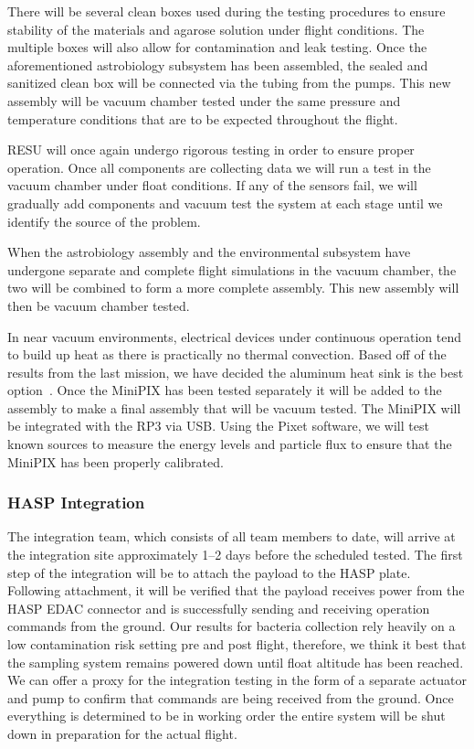 There will be several clean boxes used during the testing procedures to ensure stability of the materials and agarose solution under flight conditions. The multiple boxes will also allow for contamination and leak testing. Once the aforementioned astrobiology subsystem has been assembled, the sealed and sanitized clean box will be connected via the tubing from the pumps. This new assembly will be vacuum chamber tested under the same pressure and temperature conditions that are to be expected throughout the flight. 

RESU will once again undergo rigorous testing in order to ensure proper operation. Once all components are collecting data we will run a test in the vacuum chamber under float conditions. If any of the sensors fail, we will gradually add components and vacuum test the system at each stage until we identify the source of the problem.

When the astrobiology assembly and the environmental subsystem have undergone separate and complete flight simulations in the vacuum chamber, the two will be combined to form a more complete assembly. This new assembly will then be vacuum chamber tested. 

In near vacuum environments, electrical devices under continuous operation tend to build up heat as there is practically no thermal convection. Based off of the results from the last mission, we have decided the aluminum heat sink is the best option~\cite{SORA}. Once the MiniPIX has been tested separately it will be added to the assembly to make a final assembly that will be vacuum tested. The MiniPIX will be integrated with the RP3 via USB. Using the Pixet software, we will test known sources to measure the energy levels and particle flux to ensure that the MiniPIX has been properly calibrated.
    

\subsubsection{HASP Integration}
The integration team, which consists of all team members to date, will arrive at the integration site approximately \numrange{1}{2} days before the scheduled tested. The first step of the integration will be to attach the payload to the HASP plate. Following attachment, it will be verified that the payload receives power from the HASP EDAC connector and is successfully sending and receiving operation commands from the ground. Our results for bacteria collection rely heavily on a low contamination risk setting pre and post flight, therefore, we think it best that the sampling system remains powered down until float altitude has been reached. We can offer a proxy for the integration testing in the form of a separate actuator and pump to confirm that commands are being received from the ground. Once everything is determined to be in working order the entire system will be shut down in preparation for the actual flight.

